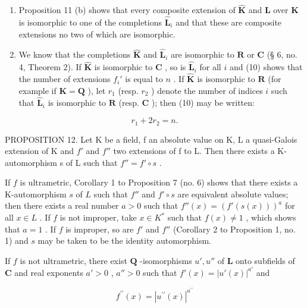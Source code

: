 \begin{enumerate}
\def\labelenumi{(\arabic{enumi})}
\item
  Proposition 11 (b) shows that every composite extension of \(\hat{\mathbf{K}}\) and \(\mathbf{L}\) over \(\mathbf{K}\) is isomorphic to one of the completions \(\hat{\mathbf{L}}_i\) and that these are composite extensions no two of which are isomorphic.
\item
  We know that the completions \(\hat{\mathbf{K}}\) and \(\hat{\mathbf{L}}_i\) are isomorphic to \(\mathbf{R}\) or \(\mathbf{C}\) (§ 6, no. 4, Theorem 2). If \(\hat{\mathbf{K}}\) is isomorphic to \(\mathbf{C}\) , so is \(\hat{\mathbf{L}}_i\) for all \(i\) and (10) shows that the number of extensions \(f_i'\) is equal to \(n\) . If \(\hat{\mathbf{K}}\) is isomorphic to \(\mathbf{R}\) (for example if \(\mathbf{K} = \mathbf{Q}\) ), let \(r_1\) (resp. \(r_2\) ) denote the number of indices \(i\) such that \(\hat{\mathbf{L}}_i\) is isomorphic to \(\mathbf{R}\) (resp. \(\mathbf{C}\) ); then (10) may be written:
\end{enumerate}

\[
r _ {1} + 2 r _ {2} = n.\tag{11}
\]

PROPOSITION 12. Let K be a field, f an absolute value on K, L a quasi-Galois extension of K and \(f'\) and \(f''\) two extensions of f to L. Then there exists a K-automorphism s of L such that \(f'' = f' \circ s\) .

If \(f\) is ultrametric, Corollary 1 to Proposition 7 (no. 6) shows that there exists a K-automorphism \(s\) of \(L\) such that \(f''\) and \(f' \circ s\) are equivalent absolute values; then there exists a real number \(a > 0\) such that \(f''(x) = (f'(s(x)))^a\) for all \(x \in L\) . If \(f\) is not improper, take \(x \in K^*\) such that \(f(x) \neq 1\) , which shows that \(a = 1\) . If \(f\) is improper, so are \(f'\) and \(f''\) (Corollary 2 to Proposition 1, no. 1) and \(s\) may be taken to be the identity automorphism.

If \(f\) is not ultrametric, there exist \(\mathbf{Q}\) -isomorphisms \(u', u''\) of \(\mathbf{L}\) onto subfields of \(\mathbf{C}\) and real exponents \(a' > 0\) , \(a'' > 0\) such that \(f'(x) = |u'(x)|^{a'}\) and

\[
f ^ {\prime \prime} (x) = | u ^ {\prime \prime} (x) | ^ {a ^ {\prime \prime}}
\]

